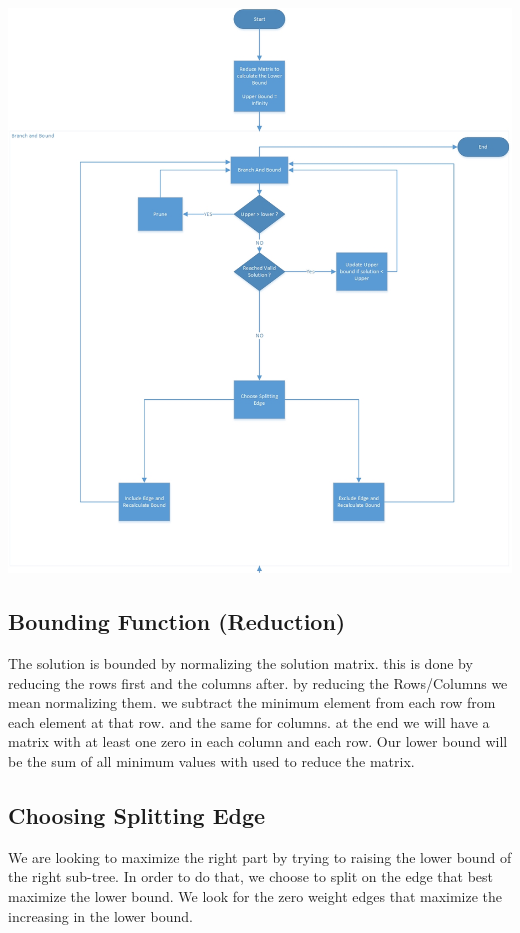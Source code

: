 \documentclass[11pt, english]{article}
\begin{document}
\includegraphics[width = \textwidth]{bnb-flow.jpg}

\newpage
\subsection{Bounding Function (Reduction)}
The solution is bounded by normalizing the solution matrix. this is done by reducing the rows first and the columns after.
by reducing the Rows/Columns we mean normalizing them. we subtract the minimum element from each row from each element at that row. and the same for columns. at the end we will have a matrix with at least one zero in each column and each row.
Our lower bound will be the sum of all minimum values with used to reduce the matrix.

\subsection{Choosing Splitting Edge}
We are looking to maximize the right part by trying to raising the lower bound of the right sub-tree. In order to do that, we choose to split on the edge that best maximize the lower bound. We look for the zero weight edges that maximize the increasing in the lower bound.
\end{document}
